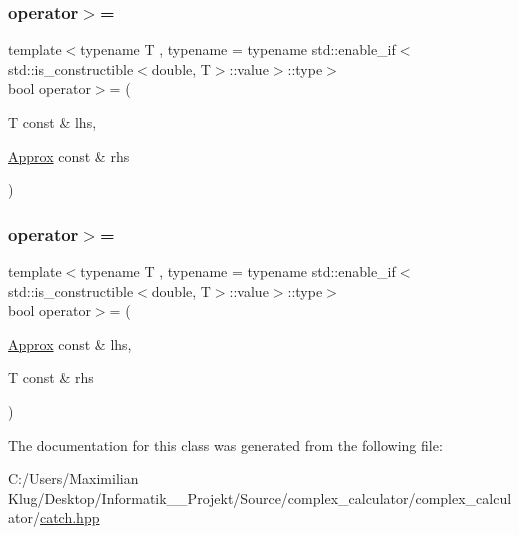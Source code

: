 \subsubsection{\texorpdfstring{operator$>$=}{operator>=}\hspace{0.1cm}{\footnotesize\ttfamily [1/2]}}
{\footnotesize\ttfamily template$<$typename T , typename  = typename std\+::enable\+\_\+if$<$std\+::is\+\_\+constructible$<$double, T$>$\+::value$>$\+::type$>$ \\
bool operator$>$= (\begin{DoxyParamCaption}\item[{T const \&}]{lhs,  }\item[{\mbox{\hyperlink{class_catch_1_1_detail_1_1_approx}{Approx}} const \&}]{rhs }\end{DoxyParamCaption})\hspace{0.3cm}{\ttfamily [friend]}}

\mbox{\label{class_catch_1_1_detail_1_1_approx_a5899b8a36725406701e2ebded2971ee6}} 
\subsubsection{\texorpdfstring{operator$>$=}{operator>=}\hspace{0.1cm}{\footnotesize\ttfamily [2/2]}}
{\footnotesize\ttfamily template$<$typename T , typename  = typename std\+::enable\+\_\+if$<$std\+::is\+\_\+constructible$<$double, T$>$\+::value$>$\+::type$>$ \\
bool operator$>$= (\begin{DoxyParamCaption}\item[{\mbox{\hyperlink{class_catch_1_1_detail_1_1_approx}{Approx}} const \&}]{lhs,  }\item[{T const \&}]{rhs }\end{DoxyParamCaption})\hspace{0.3cm}{\ttfamily [friend]}}



The documentation for this class was generated from the following file\+:\begin{DoxyCompactItemize}
\item 
C\+:/\+Users/\+Maximilian Klug/\+Desktop/\+Informatik\+\_\+\_\+\+Projekt/\+Source/complex\+\_\+calculator/complex\+\_\+calculator/\mbox{\hyperlink{catch_8hpp}{catch.\+hpp}}\end{DoxyCompactItemize}
